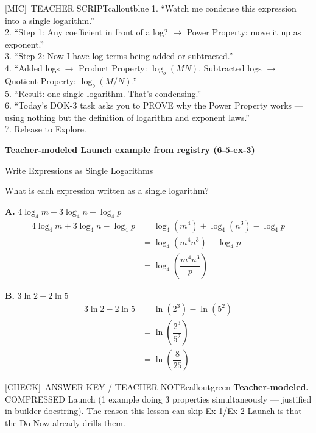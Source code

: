 \documentclass[11pt]{article}
\newcommand{\IconCheck}{[CHECK]}
\newcommand{\IconMic}{[MIC]}
\newcommand{\teacheranswerbox}[2]{%
  \begin{callout}{#1}{calloutgreen}
  #2
  \end{callout}
}
\newcommand{\teachermodeledbox}[2]{%
  \begin{tcolorbox}[
    enhanced,
    breakable,
    colback=white,
    colframe=framegray!45,
    boxrule=0.5pt,
    arc=2pt,
    left=8pt,
    right=8pt,
    top=5pt,
    bottom=5pt
  ]
  {\color{dayblue}\bfseries #1\par}
  #2
  \end{tcolorbox}
}
\begin{document}
\begin{callout}{\IconMic\ TEACHER SCRIPT}{calloutblue}
1. ``Watch me condense this expression into a single logarithm.''\\
2. ``Step 1: Any coefficient in front of a log? \(\rightarrow\) Power Property: move it up as exponent.''\\
3. ``Step 2: Now I have log terms being added or subtracted.''\\
4. ``Added logs \(\rightarrow\) Product Property: \(\log_b(MN)\). Subtracted logs \(\rightarrow\) Quotient Property: \(\log_b(M/N)\).''\\
5. ``Result: one single logarithm. That's condensing.''\\
6. ``Today's DOK-3 task asks you to PROVE why the Power Property works --- using nothing but the definition of logarithm and exponent laws.''\\
7. Release to Explore.
\end{callout}

\teachermodeledbox{Teacher-modeled Launch example from registry (6-5-ex-3)}{%
Write Expressions as Single Logarithms

What is each expression written as a single logarithm?

\textbf{A.} \(4\log_4 m + 3\log_4 n - \log_4 p\)
\begin{align*}
4\log_4 m + 3\log_4 n - \log_4 p &= \log_4(m^4) + \log_4(n^3) - \log_4 p \\
&= \log_4(m^4 n^3) - \log_4 p \\
&= \log_4\!\left(\dfrac{m^4 n^3}{p}\right)
\end{align*}

\textbf{B.} \(3\ln 2 - 2\ln 5\)
\begin{align*}
3\ln 2 - 2\ln 5 &= \ln(2^3) - \ln(5^2) \\
&= \ln\!\left(\dfrac{2^3}{5^2}\right) \\
&= \ln\!\left(\dfrac{8}{25}\right)
\end{align*}
}

\teacheranswerbox{\IconCheck\ ANSWER KEY / TEACHER NOTE}{%
\textbf{Teacher-modeled.} COMPRESSED Launch (1 example doing 3 properties simultaneously --- justified in builder docstring). The reason this lesson can skip Ex 1/Ex 2 Launch is that the Do Now already drills them.
}
\end{document}
